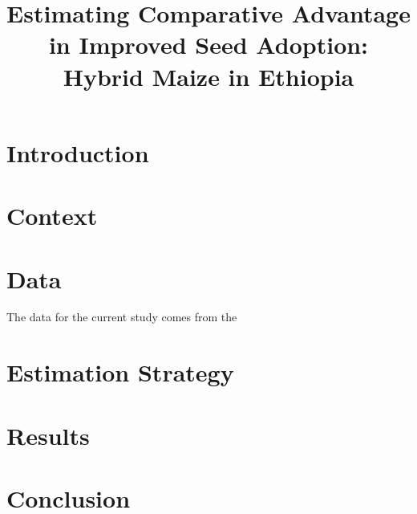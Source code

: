 \documentclass{article}
\title{Estimating Comparative Advantage in Improved Seed Adoption: Hybrid Maize in Ethiopia}
\begin{document}
\maketitle

\section{Introduction}

\section{Context}

\section{Data}

The data for the current study comes from the 

\section{Estimation Strategy}

\section{Results}

\section{Conclusion}
\end{document}
